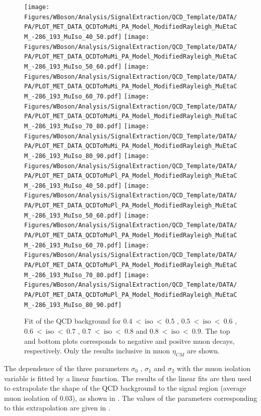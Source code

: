 \begin{figure}[htbp]
 \begin{center}
  \texttt{[image: Figures/WBoson/Analysis/SignalExtraction/QCD\_Template/DATA/PA/PLOT\_MET\_DATA\_QCDToMuMi\_PA\_Model\_ModifiedRayleigh\_MuEtaCM\_-286\_193\_MuIso\_40\_50.pdf]}
  \texttt{[image: Figures/WBoson/Analysis/SignalExtraction/QCD\_Template/DATA/PA/PLOT\_MET\_DATA\_QCDToMuMi\_PA\_Model\_ModifiedRayleigh\_MuEtaCM\_-286\_193\_MuIso\_50\_60.pdf]}
  \texttt{[image: Figures/WBoson/Analysis/SignalExtraction/QCD\_Template/DATA/PA/PLOT\_MET\_DATA\_QCDToMuMi\_PA\_Model\_ModifiedRayleigh\_MuEtaCM\_-286\_193\_MuIso\_60\_70.pdf]}
  \texttt{[image: Figures/WBoson/Analysis/SignalExtraction/QCD\_Template/DATA/PA/PLOT\_MET\_DATA\_QCDToMuMi\_PA\_Model\_ModifiedRayleigh\_MuEtaCM\_-286\_193\_MuIso\_70\_80.pdf]}
  \texttt{[image: Figures/WBoson/Analysis/SignalExtraction/QCD\_Template/DATA/PA/PLOT\_MET\_DATA\_QCDToMuMi\_PA\_Model\_ModifiedRayleigh\_MuEtaCM\_-286\_193\_MuIso\_80\_90.pdf]}
  \texttt{[image: Figures/WBoson/Analysis/SignalExtraction/QCD\_Template/DATA/PA/PLOT\_MET\_DATA\_QCDToMuPl\_PA\_Model\_ModifiedRayleigh\_MuEtaCM\_-286\_193\_MuIso\_40\_50.pdf]}
  \texttt{[image: Figures/WBoson/Analysis/SignalExtraction/QCD\_Template/DATA/PA/PLOT\_MET\_DATA\_QCDToMuPl\_PA\_Model\_ModifiedRayleigh\_MuEtaCM\_-286\_193\_MuIso\_50\_60.pdf]}
  \texttt{[image: Figures/WBoson/Analysis/SignalExtraction/QCD\_Template/DATA/PA/PLOT\_MET\_DATA\_QCDToMuPl\_PA\_Model\_ModifiedRayleigh\_MuEtaCM\_-286\_193\_MuIso\_60\_70.pdf]}
  \texttt{[image: Figures/WBoson/Analysis/SignalExtraction/QCD\_Template/DATA/PA/PLOT\_MET\_DATA\_QCDToMuPl\_PA\_Model\_ModifiedRayleigh\_MuEtaCM\_-286\_193\_MuIso\_70\_80.pdf]}
  \texttt{[image: Figures/WBoson/Analysis/SignalExtraction/QCD\_Template/DATA/PA/PLOT\_MET\_DATA\_QCDToMuPl\_PA\_Model\_ModifiedRayleigh\_MuEtaCM\_-286\_193\_MuIso\_80\_90.pdf]}
 \end{center}
 \caption{Fit of the QCD background for $0.4~<~\text{iso}~<~0.5$ , $0.5~<~\text{iso}~<~0.6$ , $0.6~<~\text{iso}~<~0.7$ , $0.7~<~\text{iso}~<~0.8$ and $0.8~<~\text{iso}~<~0.9$. The top and bottom plots corresponds to negative and positve muon decays, respectively. Only the results inclusive in muon $\eta_{CM}$ are shown.}
 \label{fig:QCD_Fits}
\end{figure}

The dependence of the three parameters $\sigma_{0}$ ,  $\sigma_{1}$ and $\sigma_{2}$ with the muon isolation variable is fitted by a linear function. The results of the linear fits are then used to  extrapolate the shape of the QCD background to the signal region (average muon isolation of 0.03), as shown in . The values of the parameters corresponding to this extrapolation are given in .

